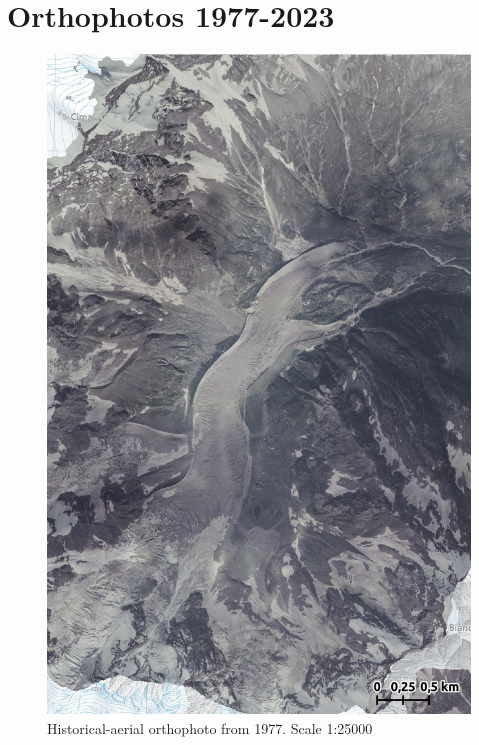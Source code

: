 \chapter{Orthophotos 1977-2023}\label{app:orthophotos}

\begin{figure}[p]
    \centering
    \includegraphics[width=\textwidth]{figures/appendix/orto_1977.jpg}
    \caption{Historical-aerial orthophoto from 1977. Scale 1:25000}
\end{figure}


